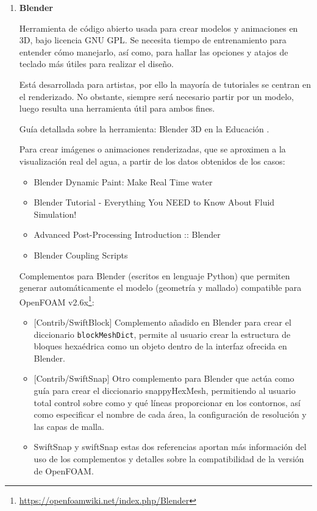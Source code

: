 \begin{enumerate}
\item
  \textbf{Blender} \cite{Blender}

  Herramienta de código abierto usada para crear modelos y animaciones en
3D, bajo licencia GNU GPL. Se necesita tiempo de entrenamiento para
entender cómo manejarlo, así como, para hallar las opciones y atajos de
teclado más útiles para realizar el diseño.

Está desarrollada para artistas, por ello la mayoría de tutoriales se
centran en el renderizado. No obstante, siempre será necesario partir
por un modelo, luego resulta una herramienta útil para ambos fines.

Guía detallada sobre la herramienta: Blender 3D en la Educación \cite{Blender3DEd}.

Para crear imágenes o animaciones renderizadas, que se aproximen a la
visualización real del agua, a partir de los datos obtenidos de los casos:

  \begin{itemize}
  \item
    Blender Dynamic Paint: Make Real Time water \cite{youtubeBlenderWater}
  \item
    Blender Tutorial - Everything You NEED to Know About Fluid Simulation! \cite{youtubeBlenderTutorial}
  \item
    Advanced Post-Processing Introduction :: Blender \cite{youtubeBlenderTraining}
  \item
    Blender Coupling Scripts \cite{BlenderCouplingScripts}
  \end{itemize}


  Complementos para Blender (escritos en lenguaje Python) que permiten
generar automáticamente el modelo (geometría y mallado) compatible para
OpenFOAM v2.6x\footnote{\url{https://openfoamwiki.net/index.php/Blender}}:

  \begin{itemize}
  \item
    {[}Contrib/SwiftBlock{]} Complemento añadido en Blender para crear el
  diccionario \texttt{blockMeshDict}, permite al usuario crear la
  estructura de bloques hexaédrica como un objeto dentro de la interfaz
  ofrecida en Blender.
  \item
    {[}Contrib/SwiftSnap{]} Otro complemento para Blender que actúa como
  guía para crear el diccionario snappyHexMesh, permitiendo al usuario
  total control sobre como y qué líneas proporcionar en los contornos,
  así como especificar el nombre de cada área, la configuración de
  resolución y las capas de malla.
  \item
    SwiftSnap \cite{cfd-online} y
  swiftSnap \cite{swiftSnap} estas dos referencias aportan más información del
  uso de los complementos y detalles sobre la compatibilidad de la
  versión de OpenFOAM.
  \end{itemize}
\end{enumerate}

